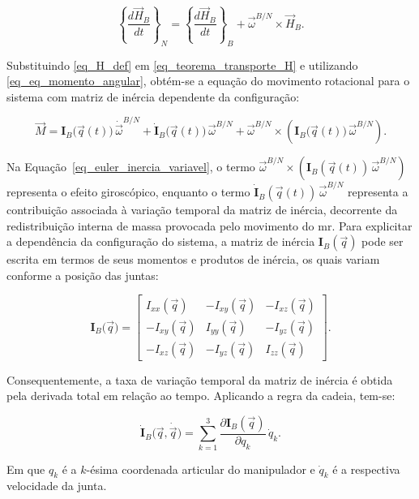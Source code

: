 \begin{equation}
\left\{ \frac{d\vec{H}_B}{dt} \right\}_{N}
=
\left\{ \frac{d\vec{H}_B}{dt} \right\}_{B}
+
\vec{\omega}^{B/N} \times \vec{H}_B.
\label{eq_teorema_transporte_H}
\end{equation}

Substituindo \eqref{eq_H_def} em \eqref{eq_teorema_transporte_H} e utilizando \eqref{eq_eq_momento_angular}, obtém-se a equação do movimento rotacional para o sistema com matriz de inércia dependente da configuração:

\begin{equation}
\vec{M}
=
\mathbf{I}_B\big(\vec{q}(t)\big)\,
\dot{\vec{\omega}}^{B/N}
+
\dot{\mathbf{I}}_B\big(\vec{q}(t)\big)\,
\vec{\omega}^{B/N}
+
\vec{\omega}^{B/N} \times
\left(
\mathbf{I}_B\big(\vec{q}(t)\big)\,
\vec{\omega}^{B/N}
\right).
\label{eq_euler_inercia_variavel}
\end{equation}

Na Equação~\eqref{eq_euler_inercia_variavel}, o termo
$\vec{\omega}^{B/N} \times \left(\mathbf{I}_B(\vec{q}(t))\,\vec{\omega}^{B/N}\right)$
representa o efeito giroscópico, enquanto o termo
$\dot{\mathbf{I}}_B(\vec{q}(t))\,\vec{\omega}^{B/N}$
representa a contribuição associada à variação temporal da matriz de inércia, decorrente da redistribuição interna de massa provocada pelo movimento do \gls{mr}.
Para explicitar a dependência da configuração do sistema, a matriz de inércia $\mathbf{I}_B(\vec{q})$ pode ser escrita em termos de seus momentos e produtos de inércia, os quais variam conforme a posição das juntas:

\begin{equation}
\mathbf{I}_B\big(\vec{q}\big)
=
\begin{bmatrix}
I_{xx}(\vec{q}) & -I_{xy}(\vec{q}) & -I_{xz}(\vec{q}) \\
-I_{xy}(\vec{q}) & I_{yy}(\vec{q}) & -I_{yz}(\vec{q}) \\
-I_{xz}(\vec{q}) & -I_{yz}(\vec{q}) & I_{zz}(\vec{q})
\end{bmatrix}.
\label{eq_matriz_inercia_expandida}
\end{equation}

Consequentemente, a taxa de variação temporal da matriz de inércia é obtida pela derivada total em relação ao tempo. Aplicando a regra da cadeia, tem-se:

\begin{equation}
\dot{\mathbf{I}}_B\big(\vec{q}, \dot{\vec{q}}\big)
=
\sum_{k=1}^{3}
\frac{\partial \mathbf{I}_B(\vec{q})}{\partial q_k}\,\dot{q}_k.
\label{eq_derivada_inercia_expandida}
\end{equation}

Em que $q_k$ é a $k$-ésima coordenada articular do manipulador e $\dot{q}_k$ é a respectiva velocidade da junta.